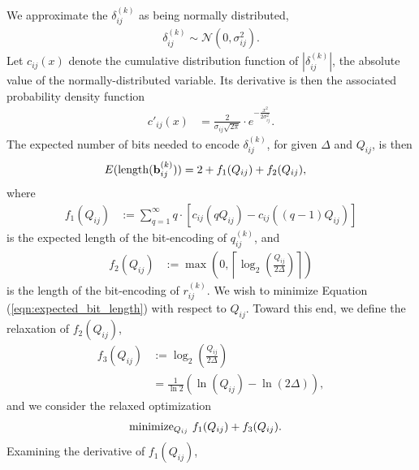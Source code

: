 \documentclass{article}
\begin{document}
We approximate the $\delta^{(k)}_{ij}$ as being normally distributed, 
\begin{align} 
\delta^{(k)}_{ij} \sim {\mathcal{N}}(0, \sigma^2_{ij}). 
\end{align} 
Let $c_{ij}(x)$ denote the cumulative distribution function of $|\delta^{(k)}_{ij}|$, the absolute value of the normally-distributed variable. Its derivative is then the associated probability density function 
\begin{align} 
c'_{ij}(x) &= \frac{2}{\sigma_{ij} \sqrt{2 \pi}} \cdot e^{- \frac{x^2}{2 \sigma_{ij}^2}}. 
\end{align} 
The expected number of bits needed to encode $\delta^{(k)}_{ij}$, for given $\Delta$ and $Q_{ij}$, is then 
\begin{align} 
E({\rm length}(\mathbf{b}^{(k)}_{ij})) & = 2 + f_1(Q_{ij}) + f_2(Q_{ij}), \label{eqn:expected_bit_length} 
\end{align} 
where 
\begin{align} 
f_1(Q_{ij}) & := \sum_{q = 1}^\infty q \cdot \left[ c_{ij}(q Q_{ij}) - c_{ij}((q-1) Q_{ij}) \right] 
\end{align} 
is the expected length of the bit-encoding of $q^{(k)}_{ij}$, and 
\begin{align} 
f_2(Q_{ij}) & := \max\left( 0, \left \lceil \log_2\left( \frac{Q_{ij}}{2 \Delta} \right) \right \rceil \right) 
\end{align} 
is the length of the bit-encoding of $r^{(k)}_{ij}$. We wish to minimize Equation (\ref{eqn:expected_bit_length}) with respect to $Q_{ij}$. Toward this end, we define the relaxation of $f_2(Q_{ij})$, 
\begin{align} 
f_3(Q_{ij}) & := \log_2\left( \frac{Q_{ij}}{2 \Delta} \right) \\ 
& = \frac{1}{\ln 2} \left( \ln (Q_{ij}) - \ln (2 \Delta) \right), 
\end{align} 
and we consider the relaxed optimization 
\begin{align} 
{\rm minimize}_{Q_{ij}} & ~ f_1(Q_{ij}) + f_3(Q_{ij}). 
\end{align} 
Examining the derivative of $f_1(Q_{ij})$, 
\end{document}
